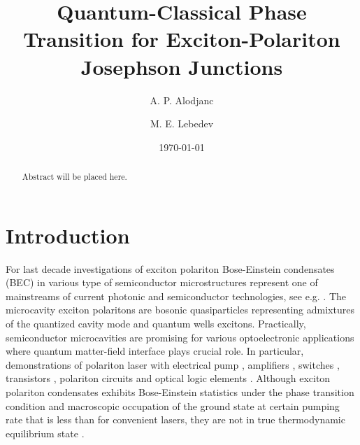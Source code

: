 \documentclass[aps, pre, preprint, groupedaddress, superscriptaddress, showkeys, showpacs] {revtex4-1}
\begin{document}
\title{Quantum-Classical Phase Transition for Exciton-Polariton Josephson Junctions}

\author{A. P. Alodjanc}

\author{M. E. Lebedev}

\date{\today}

\begin{abstract}
Abstract will be placed here.
\end{abstract}

\pacs{\dots}
\keywords{\dots}

\maketitle

\newcommand{\sn}{\textrm{sn}}
\newcommand{\cn}{\textrm{cn}}
\newcommand{\dn}{\textrm{dn}}
\newcommand{\sd}{\textrm{sd}}
\newcommand{\cd}{\textrm{cd}}
\newcommand{\nd}{\textrm{nd}}
\newcommand{\am}{\textrm{am}}

\newcommand{\red}{\color{red}}

\section{Introduction \label{sec:introduction}}

For last decade investigations of exciton polariton Bose-Einstein condensates (BEC) in various type of semiconductor microstructures represent one of mainstreams of current photonic and semiconductor technologies, see e.g. \cite{1,2}.
The microcavity exciton polaritons are bosonic quasiparticles representing  admixtures of the quantized cavity mode and quantum wells excitons.
Practically, semiconductor microcavities are promising for various optoelectronic applications where quantum  matter-field interface plays crucial role.
In particular, demonstrations of polariton laser with electrical pump \cite{3,4}, amplifiers \cite{5}, switches \cite{6}, transistors \cite{7}, polariton circuits and optical logic elements \cite{8,9}.
Although exciton polariton condensates exhibits Bose-Einstein statistics under the phase transition condition and macroscopic occupation of the ground state at certain pumping rate that is less than for convenient lasers, they are not in true thermodynamic equilibrium state \cite{10,11}.
  
\end{document}
